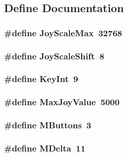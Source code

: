 \subsection{Define Documentation}
\hypertarget{ID__IN_8C_ab56158b7f46e787501836a0a818f5c1d}{
\subsubsection[{JoyScaleMax}]{\setlength{\rightskip}{0pt plus 5cm}\#define JoyScaleMax~32768}}
\label{ID__IN_8C_ab56158b7f46e787501836a0a818f5c1d}
\hypertarget{ID__IN_8C_aef1c776ac5314f1c9ef1cfc315bb1c31}{
\subsubsection[{JoyScaleShift}]{\setlength{\rightskip}{0pt plus 5cm}\#define JoyScaleShift~8}}
\label{ID__IN_8C_aef1c776ac5314f1c9ef1cfc315bb1c31}
\hypertarget{ID__IN_8C_ac250ed4d7e19a3f136c6431fc281b6b9}{
\subsubsection[{KeyInt}]{\setlength{\rightskip}{0pt plus 5cm}\#define KeyInt~9}}
\label{ID__IN_8C_ac250ed4d7e19a3f136c6431fc281b6b9}
\hypertarget{ID__IN_8C_a444f89dca4b40f43f6bc21b7cc4e4905}{
\subsubsection[{MaxJoyValue}]{\setlength{\rightskip}{0pt plus 5cm}\#define MaxJoyValue~5000}}
\label{ID__IN_8C_a444f89dca4b40f43f6bc21b7cc4e4905}
\hypertarget{ID__IN_8C_ab05e3da4f514a6b22b5752a361169045}{
\subsubsection[{MButtons}]{\setlength{\rightskip}{0pt plus 5cm}\#define MButtons~3}}
\label{ID__IN_8C_ab05e3da4f514a6b22b5752a361169045}
\hypertarget{ID__IN_8C_a1795ad7e960197e84346c3cb2e33614b}{
\subsubsection[{MDelta}]{\setlength{\rightskip}{0pt plus 5cm}\#define MDelta~11}}
